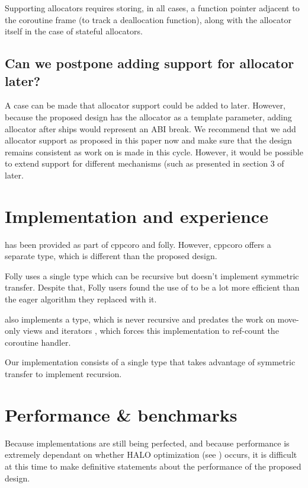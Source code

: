 \documentclass{wg21}
\begin{document}
Supporting allocators requires storing, in all cases, a function pointer adjacent to the coroutine frame (to track a deallocation function),
along with the allocator itself in the case of stateful allocators.


\subsection{Can we postpone adding support for allocator later?}

A case can be made that allocator support could be added to  later.
However, because the proposed design has the allocator as a template parameter, 
adding allocator after  ships would represent an ABI break.
We recommend that we add allocator support as proposed in this paper now and make sure that the design remains consistent as work on 
is made in this cycle.
However, it would be possible to extend support for different mechanisms (such as presented in section 3 of  later.

\section{Implementation and experience}

 has been provided as part of cppcoro and folly.
However, cppcoro offers a separate  type, which is different than the proposed design.

Folly uses a single  type which can be recursive but doesn't implement symmetric transfer. Despite that,
Folly users found the use of  to be a lot more efficient than the eager algorithm they replaced with it.

 also implements a  type, which is never recursive and predates the work on move-only views and
iterators \cite{P1456R1}, \cite{P1207R0} which forces this implementation to ref-count the coroutine handler.

Our implementation \cite{Implementation} consists of a single type that takes advantage of symmetric transfer to implement
recursion.

\section{Performance \& benchmarks}

Because implementations are still being perfected, and because performance is extremely dependant on whether HALO optimization (see )
occurs, it is difficult at this time to make definitive statements about the performance of the proposed design.
\end{document}
